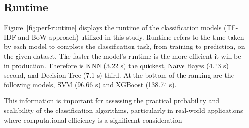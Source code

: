 \break

\subsection{Runtime}


Figure~\ref{fig:perf-runtime} displays the runtime of the classification models (TF-IDF and BoW approach) utilized in this study. Runtime refers to the time taken by each model to complete the classification task, from training to prediction, on the given dataset. The faster the model’s runtime is the more efficient it will be in production. Therefore is KNN (3.22 s) the quickest, Naïve Bayes (4.73 s) second, and Decision Tree (7.1 s) third. At the bottom of the ranking are the following models, SVM (96.66 s) and XGBoost (138.74 s).

This information is important for assessing the practical probability and scalability of the classification algorithms, particularly in real-world applications where computational efficiency is a significant consideration.
